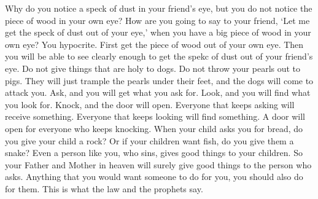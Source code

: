 Why do you notice a speck of dust in your friend's eye, but you do not notice the piece of wood in your own eye?
\bverse \iffalse Or how wilt thou say to thy brother: Let me pull the mote out of thine eye--and behold, a beam is in thine own eye? \fi
How are you going to say to your friend, \lq Let me get the speck of dust out of your eye,\rq{} when you have a big piece of wood in your own eye?
\bverse \iffalse Thou hypocrite, first cast the beam out of thine own eye; and then shalt thou see clearly to cast the mote out of thy brother's eye. \fi
You hypocrite. First get the piece of wood out of your own eye. Then you will be able to see clearly enough to get the spekc of dust out of your friend's eye.
\bverse \iffalse Give not that which is holy unto the dogs, neither cast ye your pearls before swine, lest they trample them under their feet, and turn again and rend you. \fi
Do not give things that are holy to dogs. Do not throw your pearls out to pigs. They will just trample the pearls under their feet, and the dogs will come to attack you.
\bverse \iffalse Ask, and it shall be given unto you; seek, and ye shall find; knock, and it shall be opened unto you. \fi
Ask, and you will get what you ask for. Look, and you will find what you look for. Knock, and the door will open.
\bverse \iffalse For every one that asketh, receiveth; and he that seeketh, findeth; and to him that knocketh, it shall be opened. \fi
Everyone that keeps asking will receive something. Everyone that keeps looking will find something. A door will open for everyone who keeps knocking.
\bverse \iffalse Or what man is there of you, who, if his son ask bread, will give him a stone? \fi
When your child asks you for bread, do you give your child a rock?
\bverse \iffalse Or if he ask a fish, will he give him a serpent? \fi
Or if your children want fish, do you give them a snake?
\bverse \iffalse If ye then, being evil, know how to give good gifts unto your children, how much more shall your Father who is in heaven give good things to them that ask him? \fi
Even a person like you, who sins, gives good things to your children. So your Father and Mother in heaven will surely give good things to the person who asks.
\bverse \iffalse Therefore, all things whatsoever ye would that men should do to you, do ye even so to them, for this is the law and the prophets. \fi
Anything that you would want someone to do for you, you should also do for them. This is what the law and the prophets say.
